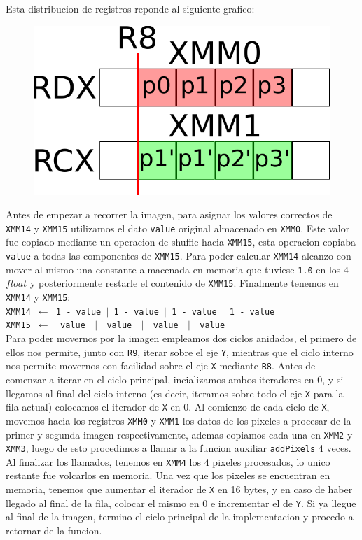 Esta distribucion de registros reponde al siguiente grafico:

\begin{figure}[h!]
	\centering
	\includegraphics[scale=0.5]{images/MergeASM1_0}
\end{figure}

Antes de empezar a recorrer la imagen, para asignar los valores correctos de \texttt{XMM14} y \texttt{XMM15} utilizamos el dato \texttt{value} original almacenado en \texttt{XMM0}. Este valor fue copiado mediante un operacion de shuffle hacia \texttt{XMM15}, esta operacion copiaba \texttt{value} a todas las componentes de \texttt{XMM15}. Para poder calcular \texttt{XMM14} alcanzo con mover al mismo una constante almacenada en memoria que tuviese \texttt{1.0} en los 4 $float$ y posteriormente restarle el contenido de \texttt{XMM15}. Finalmente tenemos en \texttt{XMM14} y \texttt{XMM15}:\\

\noindent
\texttt{XMM14 $\gets$ 1 - value $\vert$ 1 - value $\vert$ 1 - value $\vert$ 1 - value}\\
\texttt{XMM15 $\gets\ \ $ value $\ \ \vert\ \ $ value $\ \ \vert\ \ $ value $\ \ \vert\ \ $ value}\\

Para poder movernos por la imagen empleamos dos ciclos anidados, el primero de ellos nos permite, junto con \texttt{R9}, iterar sobre el eje \texttt{Y}, mientras que el ciclo interno nos permite movernos con facilidad sobre el eje \texttt{X} mediante \texttt{R8}. Antes de comenzar a iterar en el ciclo principal, incializamos ambos iteradores en 0, y si llegamos al final del ciclo interno (es decir, iteramos sobre todo el eje \texttt{X} para la fila actual) colocamos el iterador de \texttt{X} en 0. Al comienzo de cada ciclo de \texttt{X}, movemos hacia los registros \texttt{XMM0} y \texttt{XMM1} los datos de los pixeles a procesar de la primer y segunda imagen respectivamente, ademas copiamos cada una en \texttt{XMM2} y \texttt{XMM3}, luego de esto procedimos a llamar a la funcion auxiliar \texttt{addPixels} 4 veces. Al finalizar los llamados, tenemos en \texttt{XMM4} los 4 pixeles procesados, lo unico restante fue volcarlos en memoria. Una vez que los pixeles se encuentran en memoria, tenemos que aumentar el iterador de \texttt{X} en 16 bytes, y en caso de haber llegado al final de la fila, colocar el mismo en 0 e incrementar el de \texttt{Y}. Si ya llegue al final de la imagen, termino el ciclo principal de la implementacion y procedo a retornar de la funcion.

